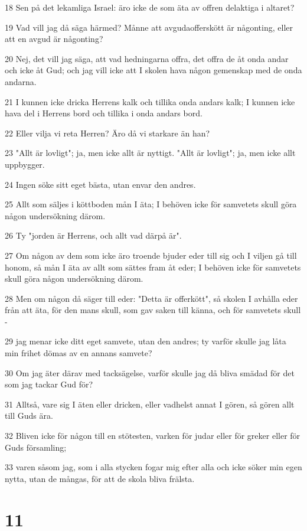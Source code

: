 \par 18 Sen på det lekamliga Israel: äro icke de som äta av offren delaktiga i altaret?
\par 19 Vad vill jag då säga härmed? Månne att avgudaofferskött är någonting, eller att en avgud är någonting?
\par 20 Nej, det vill jag säga, att vad hedningarna offra, det offra de åt onda andar och icke åt Gud; och jag vill icke att I skolen hava någon gemenskap med de onda andarna.
\par 21 I kunnen icke dricka Herrens kalk och tillika onda andars kalk; I kunnen icke hava del i Herrens bord och tillika i onda andars bord.
\par 22 Eller vilja vi reta Herren? Äro då vi starkare än han?
\par 23 "Allt är lovligt"; ja, men icke allt är nyttigt. "Allt är lovligt"; ja, men icke allt uppbygger.
\par 24 Ingen söke sitt eget bästa, utan envar den andres.
\par 25 Allt som säljes i köttboden mån I äta; I behöven icke för samvetets skull göra någon undersökning därom.
\par 26 Ty "jorden är Herrens, och allt vad därpå är".
\par 27 Om någon av dem som icke äro troende bjuder eder till sig och I viljen gå till honom, så mån I äta av allt som sättes fram åt eder; I behöven icke för samvetets skull göra någon undersökning därom.
\par 28 Men om någon då säger till eder: "Detta är offerkött", så skolen I avhålla eder från att äta, för den mans skull, som gav saken till känna, och för samvetets skull -
\par 29 jag menar icke ditt eget samvete, utan den andres; ty varför skulle jag låta min frihet dömas av en annans samvete?
\par 30 Om jag äter därav med tacksägelse, varför skulle jag då bliva smädad för det som jag tackar Gud för?
\par 31 Alltså, vare sig I äten eller dricken, eller vadhelst annat I gören, så gören allt till Guds ära.
\par 32 Bliven icke för någon till en stötesten, varken för judar eller för greker eller för Guds församling;
\par 33 varen såsom jag, som i alla stycken fogar mig efter alla och icke söker min egen nytta, utan de mångas, för att de skola bliva frälsta.

\chapter{11}


